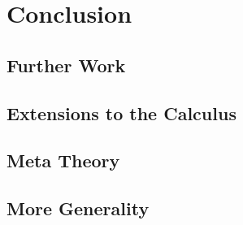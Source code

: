 \documentclass[screen,nonacm]{acmart}
\begin{document}
\section{Conclusion}\label{sec:con}

\subsection{Further Work}
\subsection*{Extensions to the Calculus}\label{sec:con-wrk}
\subsection*{Meta Theory}
\subsection*{More Generality}



\end{document}
